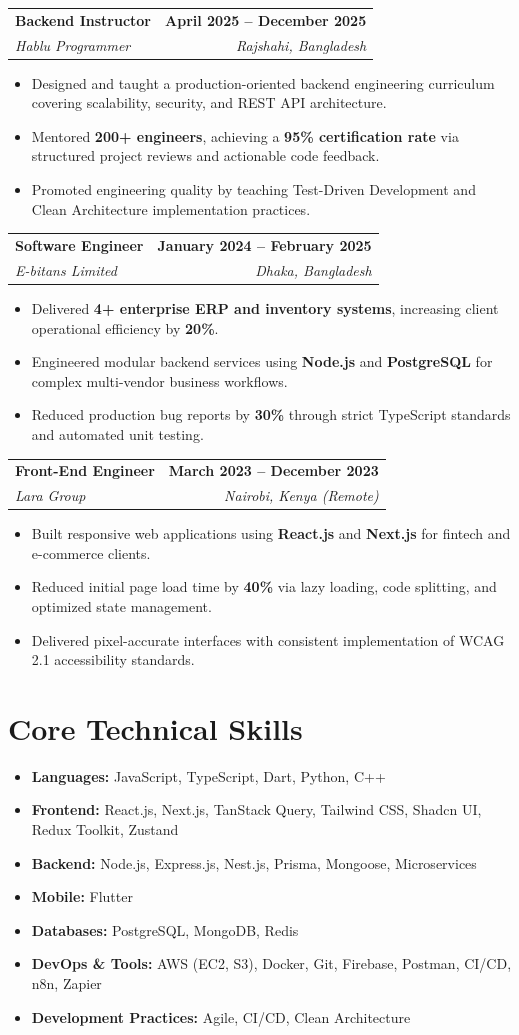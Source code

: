 \documentclass[letterpaper,11pt]{article}
\makeatletter
\newcommand{\resumeSubheading}[4]{%
  \vspace{1.5pt}
  \begin{tabularx}{\linewidth}{@{}X r@{}}
    \textbf{#1} & \textbf{#2} \\
    \textit{#3} & \textit{#4}
  \end{tabularx}
  \vspace{1pt}
}
\newcommand{\resumeItem}[1]{\item #1}
\newcommand{\skillRow}[2]{\item \textbf{#1:} #2}
\newenvironment{resumeItemList}{%
  \begin{itemize}[leftmargin=0.19in, label=\textbullet, itemsep=2pt, topsep=2pt, parsep=0pt]
}{%
  \end{itemize}
}
\makeatother
\begin{document}
\resumeSubheading
  {Backend Instructor}{April 2025 -- December 2025}
  {Hablu Programmer}{Rajshahi, Bangladesh}
\begin{resumeItemList}
  \resumeItem{Designed and taught a production-oriented backend engineering curriculum covering scalability, security, and REST API architecture.}
  \resumeItem{Mentored \textbf{200+ engineers}, achieving a \textbf{95\% certification rate} via structured project reviews and actionable code feedback.}
  \resumeItem{Promoted engineering quality by teaching Test-Driven Development and Clean Architecture implementation practices.}
\end{resumeItemList}

\resumeSubheading
  {Software Engineer}{January 2024 -- February 2025}
  {E-bitans Limited}{Dhaka, Bangladesh}
\begin{resumeItemList}
  \resumeItem{Delivered \textbf{4+ enterprise ERP and inventory systems}, increasing client operational efficiency by \textbf{20\%}.}
  \resumeItem{Engineered modular backend services using \textbf{Node.js} and \textbf{PostgreSQL} for complex multi-vendor business workflows.}
  \resumeItem{Reduced production bug reports by \textbf{30\%} through strict TypeScript standards and automated unit testing.}
\end{resumeItemList}

\resumeSubheading
  {Front-End Engineer}{March 2023 -- December 2023}
  {Lara Group}{Nairobi, Kenya (Remote)}
\begin{resumeItemList}
  \resumeItem{Built responsive web applications using \textbf{React.js} and \textbf{Next.js} for fintech and e-commerce clients.}
  \resumeItem{Reduced initial page load time by \textbf{40\%} via lazy loading, code splitting, and optimized state management.}
  \resumeItem{Delivered pixel-accurate interfaces with consistent implementation of WCAG 2.1 accessibility standards.}
\end{resumeItemList}

\section{Core Technical Skills}
\begin{itemize}[label={}, leftmargin=0in, itemsep=1pt, topsep=1pt]
  \skillRow{Languages}{JavaScript, TypeScript, Dart, Python, C++}
  \skillRow{Frontend}{React.js, Next.js, TanStack Query, Tailwind CSS, Shadcn UI, Redux Toolkit, Zustand}
  \skillRow{Backend}{Node.js, Express.js, Nest.js, Prisma, Mongoose, Microservices}
  \skillRow{Mobile}{Flutter}
  \skillRow{Databases}{PostgreSQL, MongoDB, Redis}
  \skillRow{DevOps \& Tools}{AWS (EC2, S3), Docker, Git, Firebase, Postman, CI/CD, n8n, Zapier}
  \skillRow{Development Practices}{Agile, CI/CD, Clean Architecture}
\end{itemize}
\end{document}
